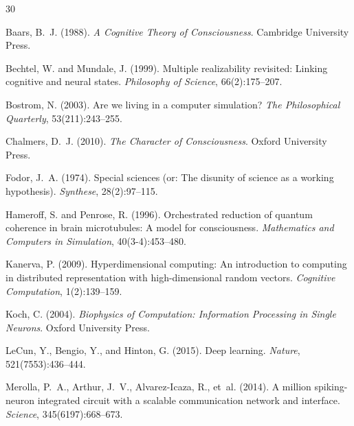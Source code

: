 \documentclass[12pt,a4paper]{article}
\begin{document}

\begin{thebibliography}{30}

Baars, B.~J. (1988).
\newblock \emph{A Cognitive Theory of Consciousness}.
\newblock Cambridge University Press.

Bechtel, W. and Mundale, J. (1999).
\newblock Multiple realizability revisited: Linking cognitive and neural states.
\newblock \emph{Philosophy of Science}, 66(2):175--207.

Bostrom, N. (2003).
\newblock Are we living in a computer simulation?
\newblock \emph{The Philosophical Quarterly}, 53(211):243--255.

Chalmers, D.~J. (2010).
\newblock \emph{The Character of Consciousness}.
\newblock Oxford University Press.

Fodor, J.~A. (1974).
\newblock Special sciences (or: The disunity of science as a working hypothesis).
\newblock \emph{Synthese}, 28(2):97--115.

Hameroff, S. and Penrose, R. (1996).
\newblock Orchestrated reduction of quantum coherence in brain microtubules: A model for consciousness.
\newblock \emph{Mathematics and Computers in Simulation}, 40(3-4):453--480.

Kanerva, P. (2009).
\newblock Hyperdimensional computing: An introduction to computing in distributed representation with high-dimensional random vectors.
\newblock \emph{Cognitive Computation}, 1(2):139--159.

Koch, C. (2004).
\newblock \emph{Biophysics of Computation: Information Processing in Single Neurons}.
\newblock Oxford University Press.

LeCun, Y., Bengio, Y., and Hinton, G. (2015).
\newblock Deep learning.
\newblock \emph{Nature}, 521(7553):436--444.

Merolla, P.~A., Arthur, J.~V., Alvarez-Icaza, R., et~al. (2014).
\newblock A million spiking-neuron integrated circuit with a scalable communication network and interface.
\newblock \emph{Science}, 345(6197):668--673.


\end{thebibliography}
\end{document}
